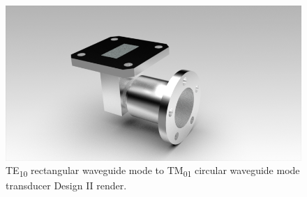 \documentclass[english,twoside]{article}
\begin{document}
		\begin{figure}[H]
			\centering
			\includegraphics[width=.7\textwidth]{renders/wrToWcTM01}
			\caption{TE\textsubscript{10} rectangular waveguide mode to TM\textsubscript{01} circular waveguide mode transducer Design II render.}
		\end{figure}
	
\end{document}
